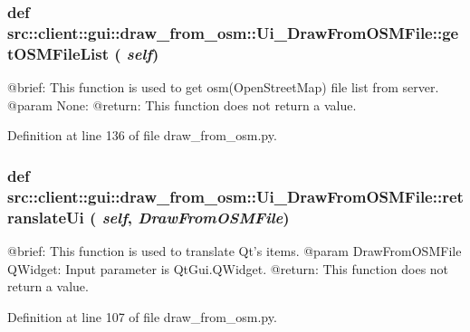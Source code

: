 \hypertarget{classsrc_1_1client_1_1gui_1_1draw__from__osm_1_1Ui__DrawFromOSMFile_ad087632c20f85122a9e6698ae5c3378d}{
\subsubsection[{getOSMFileList}]{\setlength{\rightskip}{0pt plus 5cm}def src::client::gui::draw\_\-from\_\-osm::Ui\_\-DrawFromOSMFile::getOSMFileList ( {\em self})}}
\label{classsrc_1_1client_1_1gui_1_1draw__from__osm_1_1Ui__DrawFromOSMFile_ad087632c20f85122a9e6698ae5c3378d}
\begin{DoxyVerb}
@brief: This function is used to get osm(OpenStreetMap) file list from server.
@param None:
@return: This function does not return a value.
\end{DoxyVerb}
 

Definition at line 136 of file draw\_\-from\_\-osm.py.

\hypertarget{classsrc_1_1client_1_1gui_1_1draw__from__osm_1_1Ui__DrawFromOSMFile_ae32c9120419c1f0528a468a30ec3fd52}{
\subsubsection[{retranslateUi}]{\setlength{\rightskip}{0pt plus 5cm}def src::client::gui::draw\_\-from\_\-osm::Ui\_\-DrawFromOSMFile::retranslateUi ( {\em self}, \/   {\em DrawFromOSMFile})}}
\label{classsrc_1_1client_1_1gui_1_1draw__from__osm_1_1Ui__DrawFromOSMFile_ae32c9120419c1f0528a468a30ec3fd52}
\begin{DoxyVerb}
@brief: This function is used to translate Qt's items.
@param DrawFromOSMFile QWidget: Input parameter is QtGui.QWidget.
@return: This function does not return a value.
\end{DoxyVerb}
 

Definition at line 107 of file draw\_\-from\_\-osm.py.

